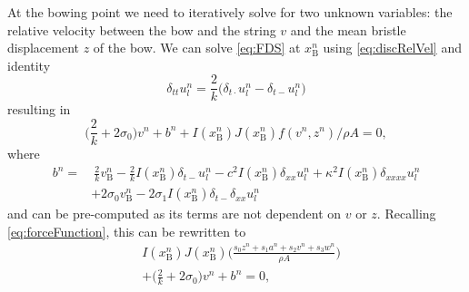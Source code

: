 \documentclass[twoside,a4paper,dvipsnames]{article}
\def\SBcomment[#1]{\textcolor{Red}{#1}}
\def\SWcomment[#1]{\textcolor{Green}{#1}}
\begin{document}
At the bowing point we need to iteratively solve for two unknown variables: the relative velocity between the bow and the string $v$ and the mean bristle displacement $z$ of the bow.
We can solve \eqref{eq:FDS} at $x_\text{B}^n$ using \eqref{eq:discRelVel} and identity \cite{Bilbao2009}
\begin{equation}
    \delta_{tt}u_l^n = \frac{2}{k}\big(\delta_{t\cdot}u_l^n-\delta_{t-}u_l^n\big)
\end{equation}
resulting in 
\begin{equation} \label{eq:incIdentity}
    \Big(\frac{2}{k}+2\sigma_{0}\Big) v^n +b^n+I(x_\text{B}^n)J(x_\text{B}^n)f(v^n,z^n)/\rho A = 0,
\end{equation}
where 
\begin{equation}
        \begin{aligned}b^n =& \: \frac{2}{k}v_\text{B}^n-\frac{2}{k}I(x_\text{B}^n)\delta_{t-}u_l^n - c^2 I(x_\text{B}^n)\delta_{xx} u_l^n +\kappa^2I(x_\text{B}^n)\delta_{xxxx} u_l^n \\
    &+ 2\sigma_0v_\text{B}^n -2\sigma_1I(x_\text{B}^n)\delta_{t-}\delta_{xx}u_l^n
\end{aligned}
\end{equation}
and can be pre-computed as its terms are not dependent on $v$ or $z$. Recalling \eqref{eq:forceFunction}, this can be rewritten to
\begin{equation}\label{eq:newtonFunction}
\begin{aligned}
    &I(x_\text{B}^n)J(x_\text{B}^n)\Bigg(\frac{s_0z^n+s_1a^n+s_2v^n+s_3w^n}{\rho A}
    \Bigg)\\
    &+ \Big(\frac{2}{k} + 2\sigma_0 \Big)v^n+ b^n= 0,
    \end{aligned}
\end{equation}
\end{document}

